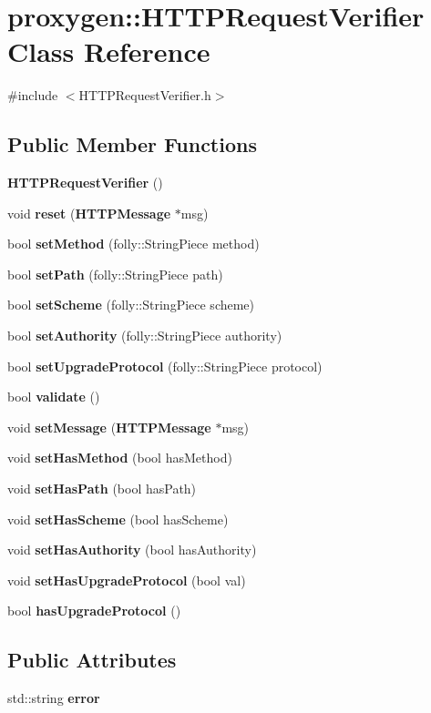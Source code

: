 \section{proxygen\+:\+:H\+T\+T\+P\+Request\+Verifier Class Reference}
\label{classproxygen_1_1HTTPRequestVerifier}


{\ttfamily \#include $<$H\+T\+T\+P\+Request\+Verifier.\+h$>$}

\subsection*{Public Member Functions}
\begin{DoxyCompactItemize}
\item 
{\bf H\+T\+T\+P\+Request\+Verifier} ()
\item 
void {\bf reset} ({\bf H\+T\+T\+P\+Message} $\ast$msg)
\item 
bool {\bf set\+Method} (folly\+::\+String\+Piece method)
\item 
bool {\bf set\+Path} (folly\+::\+String\+Piece path)
\item 
bool {\bf set\+Scheme} (folly\+::\+String\+Piece scheme)
\item 
bool {\bf set\+Authority} (folly\+::\+String\+Piece authority)
\item 
bool {\bf set\+Upgrade\+Protocol} (folly\+::\+String\+Piece protocol)
\item 
bool {\bf validate} ()
\item 
void {\bf set\+Message} ({\bf H\+T\+T\+P\+Message} $\ast$msg)
\item 
void {\bf set\+Has\+Method} (bool has\+Method)
\item 
void {\bf set\+Has\+Path} (bool has\+Path)
\item 
void {\bf set\+Has\+Scheme} (bool has\+Scheme)
\item 
void {\bf set\+Has\+Authority} (bool has\+Authority)
\item 
void {\bf set\+Has\+Upgrade\+Protocol} (bool val)
\item 
bool {\bf has\+Upgrade\+Protocol} ()
\end{DoxyCompactItemize}
\subsection*{Public Attributes}
\begin{DoxyCompactItemize}
\item 
std\+::string {\bf error}
\end{DoxyCompactItemize}

